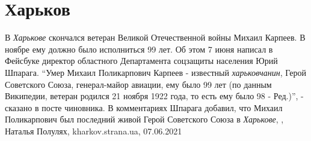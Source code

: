  
 
 
 
 
\chapter{Харьков}
\label{sec:slova.harkov}

В \emph{Харькове} скончался ветеран Великой Отечественной войны Михаил Карпеев. В
ноябре ему должно было исполниться 99 лет. Об этом 7 июня написал в Фейсбуке
директор областного Департамента соцзащиты населения Юрий Шпарага.  \enquote{Умер
Михаил Поликарпович Карпеев - известный \emph{харьковчанин}, Герой Советского Союза,
генерал-майор авиации, ему было 99 лет (по данным Википедии, ветеран родился 21
ноября 1922 года, то есть ему было 98 - Ред.)}, - сказано в посте чиновника.  В
комментариях Шпарага добавил, что Михаил Поликарпович был последний живой Герой
Советского Союза в \emph{Харькове},
, Наталья Полулях, kharkov.strana.ua, 07.06.2021

